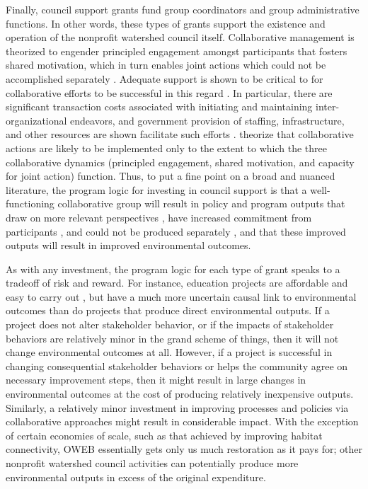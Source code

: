 \documentclass[11pt,a4paper,titlepage]{article}
\begin{document}
Finally, council support grants fund group coordinators and group administrative functions. In other words, these types of grants support the existence and operation of the nonprofit watershed council itself. Collaborative management is theorized to engender principled engagement amongst participants that fosters shared motivation, which in turn enables joint actions which could not be accomplished separately \parencite{emerson2012}. Adequate support is shown to be critical to for collaborative efforts to be successful in this regard \parencite{lubell2009}. In particular, there are significant transaction costs associated with initiating and maintaining inter-organizational endeavors, and government provision of staffing, infrastructure, and other resources are shown facilitate such efforts \parencite{schneider2003}. \textcite{emerson2012} theorize that collaborative actions are likely to be implemented only to the extent to which the three collaborative dynamics (principled engagement, shared motivation, and capacity for joint action) function. Thus, to put a fine point on a broad and nuanced literature, the program logic for investing in council support is that a well-functioning collaborative group will result in policy and program outputs that draw on more relevant perspectives \parencite{ansell2008,oleary2006,leach2006}, have increased commitment from participants \parencite{bryson2006,ansell2008}, and could not be produced separately \parencite{emerson2012}, and that these improved outputs will result in improved environmental outcomes.

As with any investment, the program logic for each type of grant speaks to a tradeoff of risk and reward. For instance, education projects are affordable and easy to carry out \parencite{leach2002}, but have a much more uncertain causal link to environmental outcomes than do projects that produce direct environmental outputs. If a project does not alter stakeholder behavior, or if the impacts of stakeholder behaviors are relatively minor in the grand scheme of things, then it will not change environmental outcomes at all. However, if a project is successful in changing consequential stakeholder behaviors or helps the community agree on necessary improvement steps, then it might result in large changes in environmental outcomes at the cost of producing relatively inexpensive outputs. Similarly, a relatively minor investment in improving processes and policies via collaborative approaches might result in considerable impact. With the exception of certain economies of scale, such as that achieved by improving habitat connectivity, OWEB essentially gets only us much restoration as it pays for; other nonprofit watershed council activities can potentially produce more environmental outputs in excess of the original expenditure.
\end{document}
